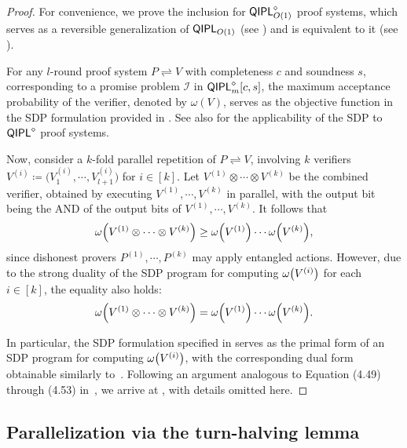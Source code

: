 \documentclass[10pt,a4paper]{article}
\numberwithin{equation}{section}
\numberwithin{figure}{section}
\newcommand{\QIPL}{\textnormal{\textsf{QIPL}}\xspace}
\newcommand{\protocol}[2]{{#1}\!\rightleftharpoons\!{#2}}
\DeclarePairedDelimiter\rbra{\lparen}{\rparen}
\newcommand{\calI}{\mathcal{I}}
\begin{document}
\begin{proof} 
    For convenience, we prove the inclusion for $\QIPL^{\diamond}_{O(1)}$ proof systems, which serves as a reversible generalization of $\QIPL_{O(1)}$  (see ) and is equivalent to it (see ). 
        
    For any $l$-round proof system $\protocol{P}{V}$ with completeness $c$ and soundness $s$, corresponding to a promise problem $\calI$ in $\QIPL^{\diamond}_m[c,s]$, the maximum acceptance probability of the verifier, denoted by $\omega(V)$, serves as the objective function in the SDP formulation provided in . See also  for the applicability of the SDP to $\QIPL^{\diamond}$ proof systems. 
    
    Now, consider a $k$-fold parallel repetition of $\protocol{P}{V}$, involving $k$ verifiers $V^{(i)} \coloneqq \big( V_1^{(i)}, \cdots, V_{l+1}^{(i)} \big)$ for $i \in [k]$. Let $V^{(1)} \!\otimes\! \cdots \!\otimes\! V^{(k)}$ be the combined verifier, obtained by executing $V^{(1)}, \cdots, V^{(k)}$ in parallel, with the output bit being the AND of the output bits of $V^{(1)},\cdots,V^{(k)}$. It follows that
    \[ \omega\rbra*{V^{(1)} \otimes \cdots \otimes V^{(k)}} \geq \omega\rbra*{V^{(1)}}  \cdots \omega\rbra*{V^{(k)}},\]
    since dishonest provers $P^{(1)}, \cdots, P^{(k)}$ may apply entangled actions. However, due to the strong duality of the SDP program for computing $\omega\rbra*{V^{(i)}}$ for each $i\in[k]$, the equality also holds: 
    \begin{equation}
        \label{eq:QIPL-parallel-repetation-pacc}
        \omega\rbra*{V^{(1)} \otimes \cdots \otimes V^{(k)}} = \omega\rbra*{V^{(1)}}  \cdots \omega\rbra*{V^{(k)}}.
    \end{equation}

    In particular, the SDP formulation specified in  serves as the primal form of an SDP program for computing $\omega\rbra*{V^{(i)}}$, with the corresponding dual form obtainable similarly to~\cite[Figure 4.7]{VW16}. Following an argument analogous to Equation (4.49) through (4.53) in~\cite[Section 4.3]{VW16}, we arrive at , with details omitted here. 
\end{proof}

\subsection{Parallelization via the turn-halving lemma}
\label{subsec:parallelization}
\end{document}
